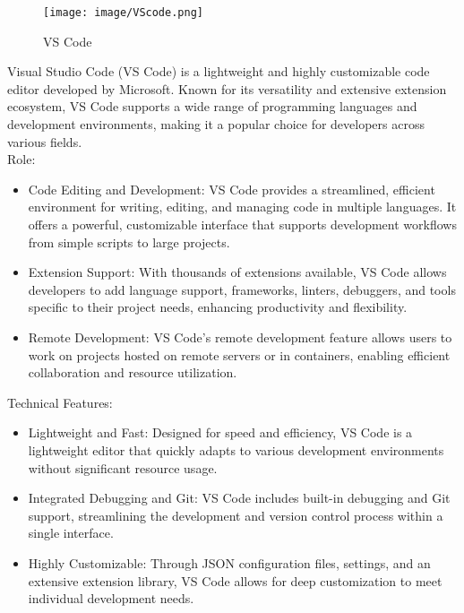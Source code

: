 \documentclass[conference]{IEEEtran}
\begin{document}
\begin{figure}[h!]
    \centering
    \texttt{[image: image/VScode.png]}
    \caption{VS Code}
    \label{fig:enter-label}
\end{figure}

\noindent Visual Studio Code (VS Code) is a lightweight and highly customizable code editor developed by Microsoft. Known for its versatility and extensive extension ecosystem, VS Code supports a wide range of programming languages and development environments, making it a popular choice for developers across various fields.\\

Role:
\begin{itemize}
    \item Code Editing and Development: VS Code provides a streamlined, efficient environment for writing, editing, and managing code in multiple languages. It offers a powerful, customizable interface that supports development workflows from simple scripts to large projects.\\
    \item Extension Support: With thousands of extensions available, VS Code allows developers to add language support, frameworks, linters, debuggers, and tools specific to their project needs, enhancing productivity and flexibility.\\
    \item Remote Development: VS Code’s remote development feature allows users to work on projects hosted on remote servers or in containers, enabling efficient collaboration and resource utilization.\\
\end{itemize}

Technical Features:
\begin{itemize}
    \item Lightweight and Fast: Designed for speed and efficiency, VS Code is a lightweight editor that quickly adapts to various development environments without significant resource usage.\\
    \item Integrated Debugging and Git: VS Code includes built-in debugging and Git support, streamlining the development and version control process within a single interface.\\
    \item Highly Customizable: Through JSON configuration files, settings, and an extensive extension library, VS Code allows for deep customization to meet individual development needs.\\
\end{itemize}
\end{document}
